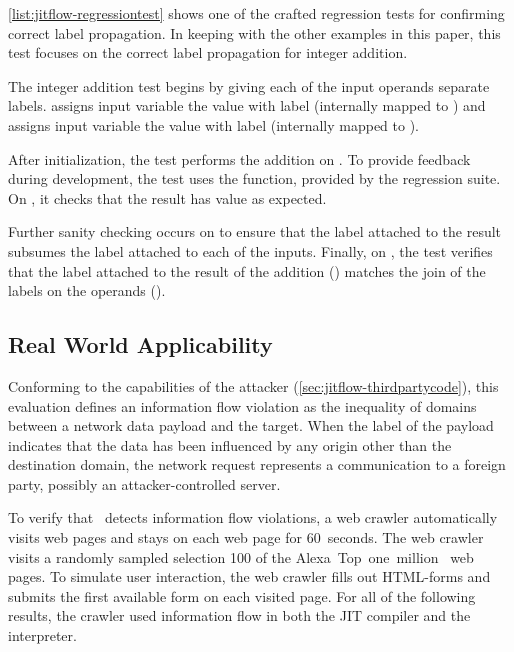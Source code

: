 \autoref{list:jitflow-regressiontest} shows one of the crafted regression tests for confirming correct label propagation.
In keeping with the other examples in this paper, this test focuses on the correct label propagation for integer addition.

The integer addition test begins by giving each of the input operands separate labels.
 assigns input variable  the value  with label  (internally mapped to ) and  assigns input variable  the value  with label  (internally mapped to ).

After initialization, the test performs the addition on .
To provide feedback during development, the test uses the  function, provided by the regression suite.
On , it checks that the result has value  as expected.

Further sanity checking occurs on  to ensure that the label attached to the result subsumes the label attached to each of the inputs.
Finally, on , the test verifies that the label attached to the result of the addition () matches the join of the labels on the operands ().


\subsection{Real World Applicability}
\label{sec:realworldapplicability}

Conforming to the capabilities of the attacker (\autoref{sec:jitflow-thirdpartycode}), this evaluation defines an information flow violation as the inequality of domains between a network data payload and the target.
When the label of the payload indicates that the data has been influenced by any origin other than the destination domain, the network request represents a communication to a foreign party, possibly an attacker-controlled server.

To verify that \JitFlow\ detects information flow violations, a web crawler automatically visits web pages and stays on each web page for 60~seconds.
The web crawler visits a randomly sampled selection 100 of the Alexa~Top~one~million~\cite{alexa} web pages.
To simulate user interaction, the web crawler fills out HTML-forms and submits the first available form on each visited page.
For all of the following results, the crawler used information flow in both the JIT compiler and the interpreter.

